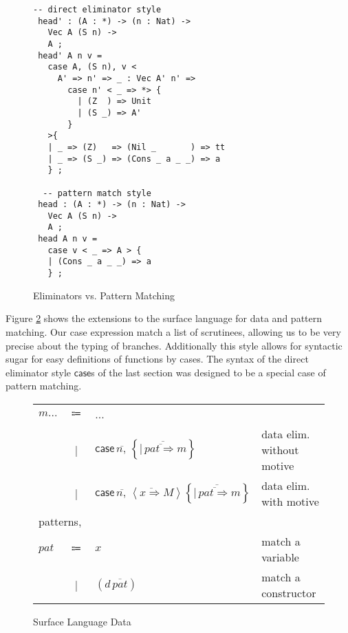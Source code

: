 
\begin{figure}
\begin{lstlisting}[basicstyle={\ttfamily\small}]
 -- direct eliminator style
 head' : (A : *) -> (n : Nat) ->
   Vec A (S n) ->
   A ;
 head' A n v =
   case A, (S n), v <
     A' => n' => _ : Vec A' n' =>
       case n' < _ => *> {
         | (Z  ) => Unit
         | (S _) => A'
       }
   >{
   | _ => (Z)   => (Nil _       ) => tt
   | _ => (S _) => (Cons _ a _ _) => a
   } ;

  -- pattern match style
 head : (A : *) -> (n : Nat) ->
   Vec A (S n) ->
   A ;
 head A n v =
   case v < _ => A > {
   | (Cons _ a _ _) => a
   } ;
\end{lstlisting}




\caption{Eliminators vs. Pattern Matching}
\label{fig:data-eliminators}
\end{figure}

Figure \ref{fig:surface-data} shows the extensions to the surface
language for data and pattern matching. Our case expression match
a list of scrutinees, allowing us to be very precise about the typing
of branches. Additionally this style allows for syntactic sugar for
easy definitions of functions by cases. The syntax of the direct eliminator
style $\mathsf{case}$s of the last section was designed to be a special
case of pattern matching. 
\begin{figure}
\begin{tabular}{lcll}
$m...$ & $\Coloneqq$ & ... & \tabularnewline
 & | & $\mathsf{case}\,\overline{n,}\,\left\{ \overline{|\,\overline{pat\Rightarrow}m}\right\} $ & data elim. without motive\tabularnewline
 & | & $\mathsf{case}\,\overline{n,}\,\left\langle \overline{x\Rightarrow}M\right\rangle \left\{ \overline{|\,\overline{pat\Rightarrow}m}\right\} $ & data elim. with motive\tabularnewline
\multicolumn{4}{l}{patterns,}\tabularnewline
$pat$ & $\Coloneqq$ & $x$ & match a variable\tabularnewline
 & | & $(d\,\overline{pat})$ & match a constructor\tabularnewline
\end{tabular}

\caption{Surface Language Data}
\label{fig:surface-data}
\end{figure}

